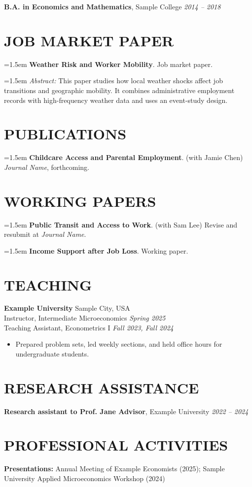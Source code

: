\documentclass[11pt]{article}
\newcommand{\pub}[2]{\noindent\hangindent=1.5em\hangafter=1
\textbf{#1}. #2\par}
\newcommand{\pubabs}[1]{\vspace{-0.2em}\noindent\hangindent=1.5em\hangafter=1
{\small \emph{Abstract:} #1}\par\vspace{0.4em}}
\begin{document}
\textbf{B.A. in Economics and Mathematics}, Sample College \hfill \emph{2014 -- 2018}

\section{{\Large J}OB MARKET PAPER}
\pub{Weather Risk and Worker Mobility}
{Job market paper.}
\pubabs{This paper studies how local weather shocks affect job transitions and geographic mobility. It combines administrative employment records with high-frequency weather data and uses an event-study design.}

\section{{\Large P}UBLICATIONS}

\pub{Childcare Access and Parental Employment}
{(with Jamie Chen) \emph{Journal Name}, forthcoming.}

\section{{\Large W}ORKING PAPERS}
\pub{Public Transit and Access to Work}
{(with Sam Lee) Revise and resubmit at \emph{Journal Name}.}

\pub{Income Support after Job Loss}
{Working paper.}

\section{{\Large T}EACHING}
\textbf{Example University} \hfill Sample City, USA\\
Instructor, Intermediate Microeconomics \hfill \emph{Spring 2025}\\
Teaching Assistant, Econometrics I \hfill \emph{Fall 2023, Fall 2024}
\begin{itemize}[leftmargin=*, label={}]
  \item Prepared problem sets, led weekly sections, and held office hours for undergraduate students.
\end{itemize}

\section{{\Large R}ESEARCH ASSISTANCE}
\textbf{Research assistant to Prof. Jane Advisor}, Example University \hfill \emph{2022 -- 2024}

\section{{\Large P}ROFESSIONAL ACTIVITIES}
\textbf{Presentations:} Annual Meeting of Example Economists (2025); Sample University Applied Microeconomics Workshop (2024)
\end{document}
